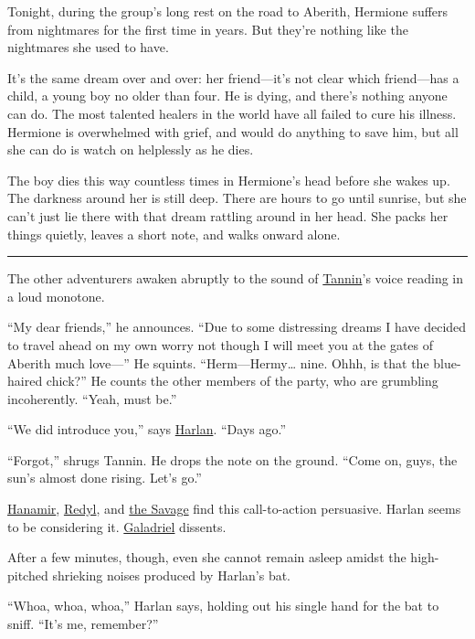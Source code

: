 \documentclass[smalldemyvopaper,11pt,twoside,onecolumn,openright,extrafontsizes]{memoir}
\newlength\drop
\begin{document}
Tonight, during the group's long rest on the road to Aberith, Hermione
suffers from nightmares for the first time in years. But they're nothing
like the nightmares she used to have.

It's the same dream over and over: her friend---it's not clear which
friend---has a child, a young boy no older than four. He is dying, and
there's nothing anyone can do. The most talented healers in the world
have all failed to cure his illness. Hermione is overwhelmed with grief,
and would do anything to save him, but all she can do is watch on
helplessly as he dies.

The boy dies this way countless times in Hermione's head before she
wakes up. The darkness around her is still deep. There are hours to go
until sunrise, but she can't just lie there with that dream rattling
around in her head. She packs her things quietly, leaves a short note,
and walks onward alone.

\begin{center}\rule{0.5\linewidth}{\linethickness}\end{center}

The other adventurers awaken abruptly to the sound of
\href{/characters/tannin/}{Tannin}'s voice reading in a loud monotone.

``My dear friends,'' he announces. ``Due to some distressing dreams I
have decided to travel ahead on my own worry not though I will meet you
at the gates of Aberith much love---'' He squints.
``Herm---Hermy\ldots{} nine. Ohhh, is that the blue-haired chick?'' He
counts the other members of the party, who are grumbling incoherently.
``Yeah, must be.''

``We did introduce you,'' says \href{/characters/harlan/}{Harlan}.
``Days ago.''

``Forgot,'' shrugs Tannin. He drops the note on the ground. ``Come on,
guys, the sun's almost done rising. Let's go.''

\href{/characters/hanamir/}{Hanamir}, \href{/characters/redyl/}{Redyl},
and \href{/characters/the-savage/}{the Savage} find this call-to-action
persuasive. Harlan seems to be considering it.
\href{/characters/galadriel/}{Galadriel} dissents.

After a few minutes, though, even she cannot remain asleep amidst the
high-pitched shrieking noises produced by Harlan's bat.

``Whoa, whoa, whoa,'' Harlan says, holding out his single hand for the
bat to sniff. ``It's me, remember?''
\end{document}
